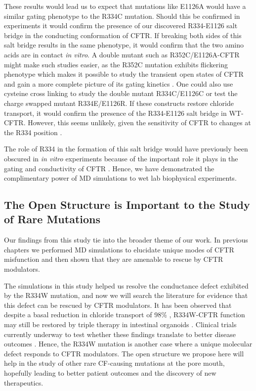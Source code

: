 These results would lead us to expect that mutations like E1126A would have a similar gating phenotype to the R334C mutation. Should this be confirmed in experiments it would confirm the presence of our discovered R334-E1126 salt bridge in the conducting conformation of CFTR. If breaking both sides of this salt bridge results in the same phenotype, it would confirm that the two amino acids are in contact \textit{in vitro}. A double mutant such as R352C/E1126A-CFTR might make such studies easier, as the R352C mutation exhibits flickering phenotype which makes it possible to study the transient open states of CFTR and gain a more complete picture of its gating kinetics \cite{csanady2017, zhang2017b}. One could also use cysteine cross linking to study the double mutant R334C/E1126C or test the charge swapped mutant R334E/E1126R. If these constructs restore chloride transport, it would confirm the presence of the R334-E1126 salt bridge in WT-CFTR. However, this seems unlikely, given the sensitivity of CFTR to changes at the R334 position \cite{gong2004}. 

The role of R334 in the formation of this salt bridge would have previously been obscured in \textit{in vitro} experiments because of the important role it plays in the gating and conductivity of CFTR \cite{gong2003, gong2004}. Hence, we have demonstrated the complimentary power of MD simulations to wet lab biophysical experiments. %

\subsection{The Open Structure is Important to the Study of Rare Mutations}

Our findings from this study tie into the broader theme of our work. In previous chapters we performed MD simulations to elucidate unique modes of CFTR misfunction and then shown that they are amenable to rescue by CFTR modulators. 

The simulations in this study helped us resolve the conductance defect exhibited by the R334W mutation, and now we will search the literature for evidence that this defect can be rescued by CFTR modulators. It has been observed that despite a basal reduction in chloride transport of 98\% \cite{han2018}, R334W-CFTR function may still be restored by triple therapy in intestinal organoids \cite{vanwilligen2019}. Clinical trials currently underway to test whether these findings translate to better disease outcomes \cite{R334W_Euro_CF_trial}. Hence, the R334W mutation is another case where a unique molecular defect responds to CFTR modulators. The open structure we propose here will help in the study of other rare CF-causing mutations at the pore mouth, hopefully leading to better patient outcomes and the discovery of new therapeutics.



